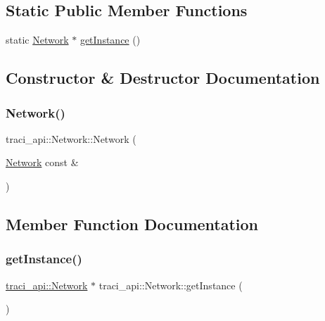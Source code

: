 \subsection*{Static Public Member Functions}
\begin{DoxyCompactItemize}
\item 
static \hyperlink{classtraci__api_1_1_network}{Network} $\ast$ \hyperlink{classtraci__api_1_1_network_ab6c12d9fa0affbeeb0d068544adb4724}{get\+Instance} ()
\end{DoxyCompactItemize}


\subsection{Constructor \& Destructor Documentation}
\mbox{\label{classtraci__api_1_1_network_a59991f6688c5c41ff4f3a5b9c941d952}} 
\subsubsection{\texorpdfstring{Network()}{Network()}}
{\footnotesize\ttfamily traci\+\_\+api\+::\+Network\+::\+Network (\begin{DoxyParamCaption}\item[{\hyperlink{classtraci__api_1_1_network}{Network} const \&}]{ }\end{DoxyParamCaption})\hspace{0.3cm}{\ttfamily [delete]}}



\subsection{Member Function Documentation}
\mbox{\label{classtraci__api_1_1_network_ab6c12d9fa0affbeeb0d068544adb4724}} 
\subsubsection{\texorpdfstring{get\+Instance()}{getInstance()}}
{\footnotesize\ttfamily \hyperlink{classtraci__api_1_1_network}{traci\+\_\+api\+::\+Network} $\ast$ traci\+\_\+api\+::\+Network\+::get\+Instance (\begin{DoxyParamCaption}{ }\end{DoxyParamCaption})\hspace{0.3cm}{\ttfamily [static]}}

